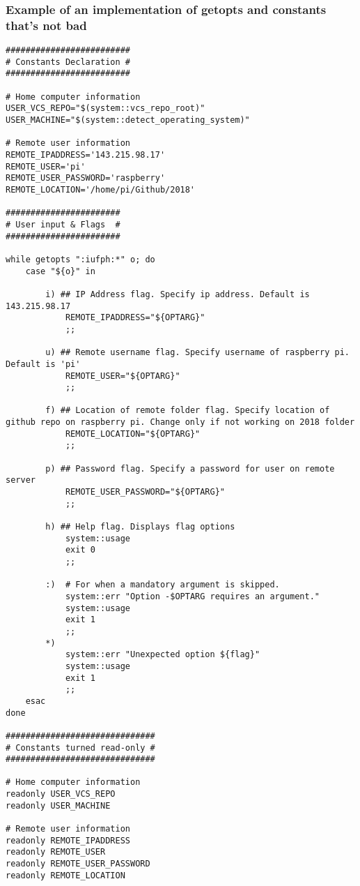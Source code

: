 \documentclass[11pt]{article}
\begin{document}
\subsubsection{Example of an implementation of getopts and constants that's not bad}
\label{sec:org40a89c0}
\begin{verbatim}
#########################
# Constants Declaration #
#########################

# Home computer information
USER_VCS_REPO="$(system::vcs_repo_root)"
USER_MACHINE="$(system::detect_operating_system)"

# Remote user information
REMOTE_IPADDRESS='143.215.98.17'
REMOTE_USER='pi'
REMOTE_USER_PASSWORD='raspberry'
REMOTE_LOCATION='/home/pi/Github/2018'

#######################
# User input & Flags  #
#######################

while getopts ":iufph:*" o; do
    case "${o}" in

        i) ## IP Address flag. Specify ip address. Default is 143.215.98.17
            REMOTE_IPADDRESS="${OPTARG}" 
            ;;

        u) ## Remote username flag. Specify username of raspberry pi. Default is 'pi'
            REMOTE_USER="${OPTARG}" 
            ;;

        f) ## Location of remote folder flag. Specify location of github repo on raspberry pi. Change only if not working on 2018 folder 
            REMOTE_LOCATION="${OPTARG}"
            ;;

        p) ## Password flag. Specify a password for user on remote server
            REMOTE_USER_PASSWORD="${OPTARG}"
            ;;

        h) ## Help flag. Displays flag options 
            system::usage
            exit 0
            ;;

        :)  # For when a mandatory argument is skipped.
            system::err "Option -$OPTARG requires an argument."
            system::usage
            exit 1
            ;;
        *) 
            system::err "Unexpected option ${flag}"
            system::usage
            exit 1 
            ;;
    esac
done

##############################
# Constants turned read-only #
##############################

# Home computer information
readonly USER_VCS_REPO
readonly USER_MACHINE

# Remote user information
readonly REMOTE_IPADDRESS
readonly REMOTE_USER
readonly REMOTE_USER_PASSWORD
readonly REMOTE_LOCATION
\end{verbatim}
\end{document}
